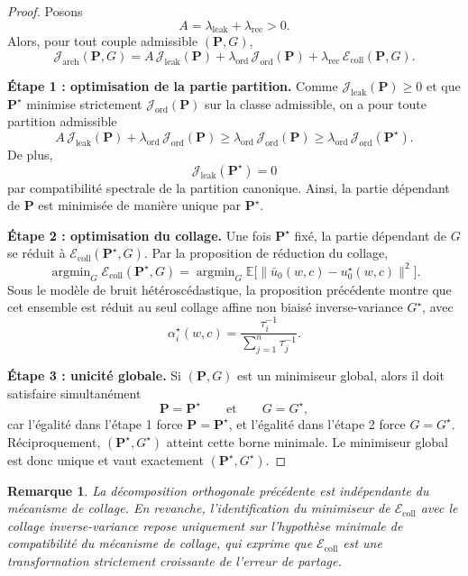 \documentclass[11pt,a4paper]{article}
\newtheorem{remark}{Remarque}[section]
\DeclareMathOperator{\argmin}{argmin}
\newcommand{\1}{\mathbf 1}
\begin{document}
\begin{proof}
Posons
\[
A=\lambda_{\mathrm{leak}}+\lambda_{\mathrm{rec}}>0.
\]
Alors, pour tout couple admissible \((\mathbf P,G)\),
\[
\mathcal J_{\mathrm{arch}}(\mathbf P,G)
=
A\,\mathcal J_{\mathrm{leak}}(\mathbf P)
+
\lambda_{\mathrm{ord}}\,\mathcal J_{\mathrm{ord}}(\mathbf P)
+
\lambda_{\mathrm{rec}}\,\mathcal E_{\mathrm{coll}}(\mathbf P,G).
\]

\medskip
\noindent
\textbf{Étape 1 : optimisation de la partie partition.}
Comme \(\mathcal J_{\mathrm{leak}}(\mathbf P)\ge 0\) et que \(\mathbf P^\star\) minimise strictement \(\mathcal J_{\mathrm{ord}}(\mathbf P)\) sur la classe admissible, on a pour toute partition admissible
\[
A\,\mathcal J_{\mathrm{leak}}(\mathbf P)+\lambda_{\mathrm{ord}}\,\mathcal J_{\mathrm{ord}}(\mathbf P)
\ge
\lambda_{\mathrm{ord}}\,\mathcal J_{\mathrm{ord}}(\mathbf P)
\ge
\lambda_{\mathrm{ord}}\,\mathcal J_{\mathrm{ord}}(\mathbf P^\star).
\]
De plus,
\[
\mathcal J_{\mathrm{leak}}(\mathbf P^\star)=0
\]
par compatibilité spectrale de la partition canonique.
Ainsi, la partie dépendant de \(\mathbf P\) est minimisée de manière unique par \(\mathbf P^\star\).

\medskip
\noindent
\textbf{Étape 2 : optimisation du collage.}
Une fois \(\mathbf P^\star\) fixé, la partie dépendant de \(G\) se réduit à \(\mathcal E_{\mathrm{coll}}(\mathbf P^\star,G)\).
Par la proposition de réduction du collage,
\[
\argmin_G \mathcal E_{\mathrm{coll}}(\mathbf P^\star,G)
=
\argmin_G \mathbb E\bigl[\|\bar u_0(w,c)-u_0^\star(w,c)\|^2\bigr].
\]
Sous le modèle de bruit hétéroscédastique, la proposition précédente montre que cet ensemble est réduit au seul collage affine non biaisé inverse-variance \(G^\star\), avec
\[
\alpha_i^\star(w,c)=\frac{\tau_i^{-1}}{\sum_{j=1}^n\tau_j^{-1}}.
\]

\medskip
\noindent
\textbf{Étape 3 : unicité globale.}
Si \((\mathbf P,G)\) est un minimiseur global, alors il doit satisfaire simultanément
\[
\mathbf P=\mathbf P^\star
\qquad\text{et}\qquad
G=G^\star,
\]
car l'égalité dans l'étape 1 force \(\mathbf P=\mathbf P^\star\), et l'égalité dans l'étape 2 force \(G=G^\star\).
Réciproquement, \((\mathbf P^\star,G^\star)\) atteint cette borne minimale.
Le minimiseur global est donc unique et vaut exactement \((\mathbf P^\star,G^\star)\).
\end{proof}

\begin{remark}
La décomposition orthogonale précédente est indépendante du mécanisme de collage.
En revanche, l'identification du minimiseur de \(\mathcal E_{\mathrm{coll}}\) avec le collage inverse-variance repose uniquement sur l'hypothèse minimale de compatibilité du mécanisme de collage, qui exprime que \(\mathcal E_{\mathrm{coll}}\) est une transformation strictement croissante de l'erreur de partage.


\end{remark}
\end{document}

